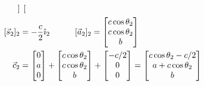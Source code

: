 \documentclass[conference]{IEEEtran}
\begin{document}
\begin{align*}
\begin{bmatrix}
                                                              \end{bmatrix}                                                                \\
    [\vec{s}_2]_2 & = -\frac{c}{2} \hat{\imath}_2 \hspace{30px} [\vec{a}_2]_2 = \begin{bmatrix}
                                                                                    c \cos \theta_2 \\
                                                                                    c \cos \theta_2 \\
                                                                                    b
                                                                                \end{bmatrix}                                             \\
    \vec{c}_2     & = \begin{bmatrix}
                          0 \\
                          a \\
                          0
                      \end{bmatrix}  + \begin{bmatrix}
                                           c \cos \theta_2 \\
                                           c \cos \theta_2 \\
                                           b
                                       \end{bmatrix} + \begin{bmatrix}
                                                           -c/2 \\
                                                           0    \\
                                                           0
                                                       \end{bmatrix}        = \begin{bmatrix}
                                                                                  c \cos \theta_2 -c/2 \\
                                                                                  a + c \cos \theta_2  \\
                                                                                  b
                                                                              \end{bmatrix}
\end{align*}
\end{document}
